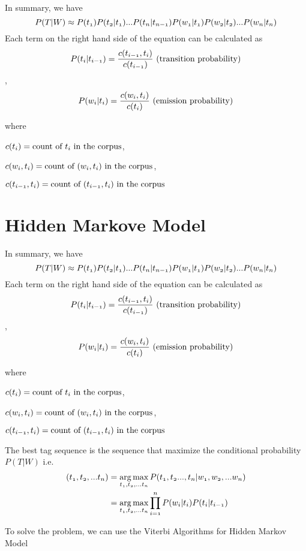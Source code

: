 \documentclass[12pt, oneside]{article}
\DeclareMathOperator*{\argmax}{arg\,max}
\begin{document}
In summary, we have 
$$\mathnormal{P(T|W) \approx P(t_1) P(t_2|t_1) ... P(t_{n}|t_{n-1}) P(w_1|t_1) P(w_2|t_2) ... P(w_n|t_n)}$$
Each term on the right hand side of the equation can be calculated as 
$$\mathnormal{P(t_{i}|t_{i-1}) = \frac{c(t_{i-1},t_{i})}{c(t_{i-1})}} \text{ (transition probability)}$$ , 
$$\mathnormal{P(w_i|t_i) = \frac{c(w_i,t_i)}{c(t_i)}} \text{ (emission probability)}$$

where 

$\mathnormal{c(t_i)} = \text{count of } \mathnormal{t_i} \text{ in the corpus}$,  

$ \mathnormal{c(w_i,t_i)} = \text{count of }  \mathnormal{(w_i, t_i)} \text{ in the corpus}$,

$ \mathnormal{c(t_{i-1},t_{i})} = \text{count of }  \mathnormal{(t_{i-1}, t_i)} \text{ in the corpus}$



\section{Hidden Markove Model}

In summary, we have 
$$\mathnormal{P(T|W) \approx P(t_1) P(t_2|t_1) ... P(t_{n}|t_{n-1}) P(w_1|t_1) P(w_2|t_2) ... P(w_n|t_n)}$$
Each term on the right hand side of the equation can be calculated as 
$$\mathnormal{P(t_{i}|t_{i-1}) = \frac{c(t_{i-1},t_{i})}{c(t_{i-1})}} \text{ (transition probability)}$$ , 
$$\mathnormal{P(w_i|t_i) = \frac{c(w_i,t_i)}{c(t_i)}} \text{ (emission probability)}$$

where 

$\mathnormal{c(t_i)} = \text{count of } \mathnormal{t_i} \text{ in the corpus}$,  

$ \mathnormal{c(w_i,t_i)} = \text{count of }  \mathnormal{(w_i, t_i)} \text{ in the corpus}$,

$ \mathnormal{c(t_{i-1},t_{i})} = \text{count of }  \mathnormal{(t_{i-1}, t_i)} \text{ in the corpus}$

The best tag sequence is the sequence that maximize the conditional probability $P(T|W)$ i.e.
\begin{align*}
\mathnormal{(t_1, t_2, ...t_n)} & = \mathnormal{\argmax_{t_1, t_2, ...t_n}P(t_1, t_2..., t_n|w_1, w_2, ...w_n)}\\
&= \mathnormal{\argmax_{t_1, t_2, ...t_n} \prod\limits_{i=1}^n P(w_i |t_i ) P(t_i |t_{i-1})}
\end{align*}

To solve the problem, we can use the Viterbi Algorithms for Hidden Markov Model
\end{document}

